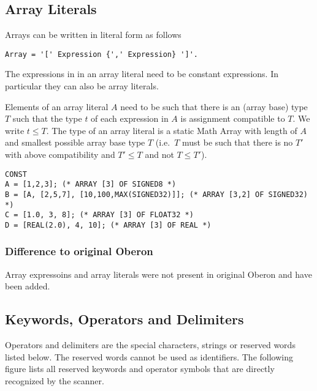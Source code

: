 \documentclass[a4wide,11pt]{article}
\begin{document}
\subsection{Array Literals}

Arrays can be written in literal form as follows
\begin{lstlisting}[style=ebnf]
Array = '[' Expression {',' Expression} ']'.
\end{lstlisting}
The expressions in in an array literal need to be constant expressions.
In particular they can also be array literals.

Elements of an array literal $A$ need to be such that there is an (array base) type $T$ such that the type $t$ of each expression in $A$ is assignment compatible to $T$.
We write $t\leq T$.
The type of an array literal is a static Math Array with length of $A$ and smallest possible array base type $T$ (i.e.\ $T$ must be such that there is no $T'$ with above compatibility and $T'\leq T$ and not $T \leq T'$).

\begin{annotation}
\begin{lstlisting}[style=example, caption=Examples of array literals in constant declarations]
CONST
A = [1,2,3]; (* ARRAY [3] OF SIGNED8 *)
B = [A, [2,5,7], [10,100,MAX(SIGNED32)]]; (* ARRAY [3,2] OF SIGNED32) *)
C = [1.0, 3, 8]; (* ARRAY [3] OF FLOAT32 *)
D = [REAL(2.0), 4, 10]; (* ARRAY [3] OF REAL *)
\end{lstlisting}

\subsubsection{Difference to original Oberon}
Array expressoins and array literals were not present in original Oberon and have been added.
\end{annotation}

\subsection{Keywords, Operators and Delimiters}
Operators and delimiters are the special characters, strings or reserved words listed below.
The reserved words cannot be used as identifiers.
The following figure lists all reserved keywords and operator symbols that are directly recognized by the scanner.
\end{document}
